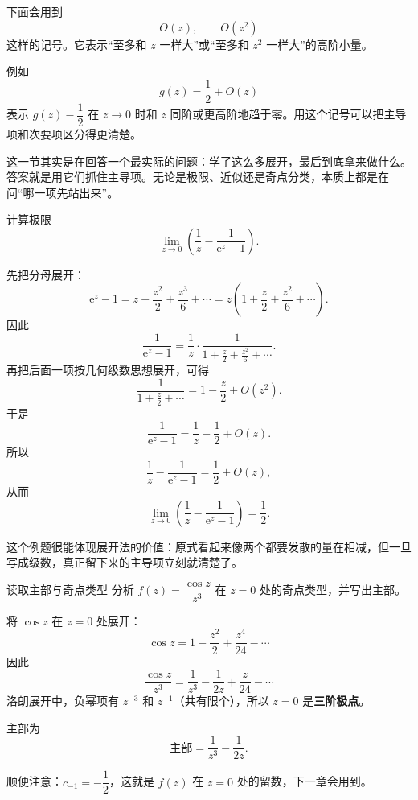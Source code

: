 \begin{tishi}[关于 $O(z)$ 记号]
下面会用到
\[
    O(z),\qquad O(z^2)
\]
这样的记号。它表示``至多和 $z$ 一样大''或``至多和 $z^2$ 一样大''的高阶小量。

例如
\[
    g(z)=\frac{1}{2}+O(z)
\]
表示 $g(z)-\dfrac{1}{2}$ 在 $z\to 0$ 时和 $z$ 同阶或更高阶地趋于零。用这个记号可以把主导项和次要项区分得更清楚。
\end{tishi}

\begin{zhu}{}{}
这一节其实是在回答一个最实际的问题：学了这么多展开，最后到底拿来做什么。答案就是用它们抓住主导项。无论是极限、近似还是奇点分类，本质上都是在问``哪一项先站出来''。
\end{zhu}

\begin{lizi}{}{}
计算极限
\[
    \lim_{z\to 0}\left(\frac{1}{z}-\frac{1}{\mathrm{e}^z-1}\right).
\]

\begin{jie}
先把分母展开：
\[
    \mathrm{e}^z-1 = z+\frac{z^2}{2}+\frac{z^3}{6}+\cdots
    = z\left(1+\frac{z}{2}+\frac{z^2}{6}+\cdots\right).
\]
因此
\[
    \frac{1}{\mathrm{e}^z-1}
    = \frac{1}{z}\cdot
    \frac{1}{1+\frac{z}{2}+\frac{z^2}{6}+\cdots}.
\]
再把后面一项按几何级数思想展开，可得
\[
    \frac{1}{1+\frac{z}{2}+\cdots}
    = 1-\frac{z}{2}+O(z^2).
\]
于是
\[
    \frac{1}{\mathrm{e}^z-1}
    = \frac{1}{z}-\frac{1}{2}+O(z).
\]
所以
\[
    \frac{1}{z}-\frac{1}{\mathrm{e}^z-1}
    = \frac{1}{2}+O(z),
\]
从而
\[
    \lim_{z\to 0}\left(\frac{1}{z}-\frac{1}{\mathrm{e}^z-1}\right)=\frac{1}{2}.
\]
\end{jie}
\end{lizi}

\begin{zhu}{}{}
这个例题很能体现展开法的价值：原式看起来像两个都要发散的量在相减，但一旦写成级数，真正留下来的主导项立刻就清楚了。
\end{zhu}

\begin{lizi}{读取主部与奇点类型}{}
分析 $f(z)=\dfrac{\cos z}{z^3}$ 在 $z=0$ 处的奇点类型，并写出主部。
\end{lizi}

\begin{jie}
将 $\cos z$ 在 $z=0$ 处展开：
\[
    \cos z = 1 - \frac{z^2}{2} + \frac{z^4}{24} - \cdots
\]
因此
\[
    \frac{\cos z}{z^3} = \frac{1}{z^3} - \frac{1}{2z} + \frac{z}{24} - \cdots
\]
洛朗展开中，负幂项有 $z^{-3}$ 和 $z^{-1}$（共有限个），所以 $z=0$ 是\textbf{三阶极点}。

主部为
\[
    \text{主部} = \frac{1}{z^3} - \frac{1}{2z}.
\]

顺便注意：$c_{-1}=-\dfrac{1}{2}$，这就是 $f(z)$ 在 $z=0$ 处的留数，下一章会用到。
\end{jie}


